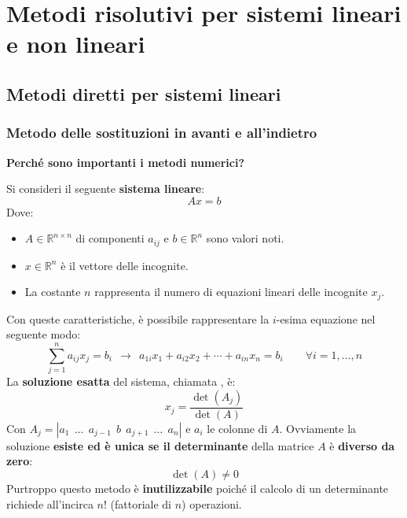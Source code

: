 \section{Metodi risolutivi per sistemi lineari e non lineari}

\subsection{Metodi diretti per sistemi lineari}

\subsubsection{Metodo delle sostituzioni in avanti e all'indietro}

\begin{flushleft}
    \textcolor{Green3}{ \textbf{Perché sono importanti i metodi numerici?}}
\end{flushleft}
Si consideri il seguente \textbf{sistema lineare}:
\begin{equation*}
    Ax = b
\end{equation*}
Dove:
\begin{itemize}
    \item $A \in \mathbb{R}^{n \times n}$ di componenti $a_{ij}$ e $b \in \mathbb{R}^{n}$ sono valori noti.

    \item $x \in \mathbb{R}^{n}$ è il vettore delle incognite.
    
    \item La costante $n$ rappresenta il numero di equazioni lineari delle incognite $x_{j}$.
\end{itemize}
Con queste caratteristiche, è possibile rappresentare la $i$-esima equazione nel seguente modo:
\begin{equation*}
    \displaystyle\sum_{j=1}^{n} a_{ij} x_{j} = b_{i} \:\: \rightarrow \:\: a_{1i}x_{1} + a_{i2} x_{2} + \cdots + a_{in}x_{n} = b_{i} \hspace{2em} \forall i = 1, \dots , n
\end{equation*}
La \textbf{soluzione esatta} del sistema, chiamata , è:
\begin{equation}\label{eq: formula di Cramer}
    x_{j} = \dfrac{\det\left(A_{j}\right)}{\det\left(A\right)}
\end{equation}
Con $A_{j} = \left|a_{1} \:\: \dots \:\: a_{j-1} \:\: b \:\: a_{j+1} \:\: \dots \:\: a_{n} \right|$ e $a_{i}$ le colonne di $A$. Ovviamente la soluzione \textbf{esiste ed è unica se il determinante} della matrice $A$ è \textbf{diverso da zero}:
\begin{equation*}
    \det\left(A\right) \ne 0
\end{equation*}
Purtroppo questo metodo è \textbf{inutilizzabile} poiché il calcolo di un determinante richiede all'incirca $n!$ (fattoriale di $n$) operazioni.

